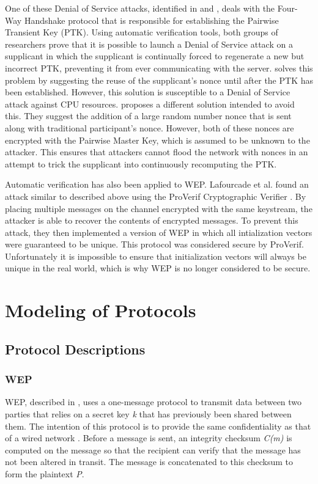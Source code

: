 \documentclass[11pt, twocolumn]{article} %
\begin{document}
One of these Denial of Service attacks, identified in \cite{he04} and \cite{liu08}, deals with the Four-Way Handshake protocol that is responsible for establishing the Pairwise Transient Key (PTK).  Using automatic verification tools, both groups of researchers prove that it is possible to launch a Denial of Service attack on a supplicant in which the supplicant is continually forced to regenerate a new but incorrect PTK, preventing it from ever communicating with the server.  \cite{he04} solves this problem by suggesting the reuse of the supplicant's nonce until after the PTK has been established.  However, this solution is susceptible to a Denial of Service attack against CPU resources.  \cite{liu08} proposes a different solution intended to avoid this.  They suggest the addition of a large random number nonce that is sent along with traditional participant's nonce.  However, both of these nonces are encrypted with the Pairwise Master Key, which is assumed to be unknown to the attacker.  This ensures that attackers cannot flood the network with nonces in an attempt to trick the supplicant into continuously recomputing the PTK.

Automatic verification has also been applied to WEP.  Lafourcade et al. found an attack similar to \cite{borisov01} described above using the ProVerif Cryptographic Verifier \cite{lafourcade10}. By placing multiple messages on the channel encrypted with the same keystream, the attacker is able to recover the contents of encrypted messages.  To prevent this attack, they then implemented a version of WEP in which all intialization vectors were guaranteed to be unique.  This protocol was considered secure by ProVerif.  Unfortunately it is impossible to ensure that initialization vectors will always be unique in the real world, which is why WEP is no longer considered to be secure.
 
\section{Modeling of Protocols}
\label{sec:model}
\subsection{Protocol Descriptions}
\subsubsection{WEP}
\label{sec:WEP Desc}
WEP, described in \cite{borisov01}, uses a one-message protocol to transmit data between two parties that relies on a secret key \textit{k} that has previously been shared between them.  The intention of this protocol is to provide the same confidentiality as that of a wired network \cite{IEEE802.11}.  Before a message is sent, an integrity checksum \textit{C(m)} is computed on the message so that the recipient can verify that the message has not been altered in transit.  The message is concatenated to this checksum to form the plaintext \textit{P}.
\end{document}
